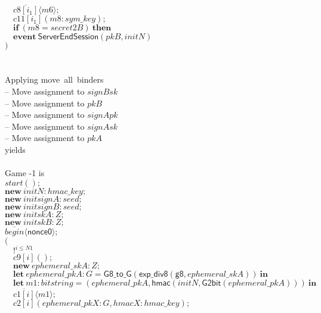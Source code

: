 \documentclass{article}
\newcommand{\cinput}[2]{{#1}({#2})}
\newcommand{\coutput}[2]{\overline{#1}\langle{#2}\rangle}
\newcommand{\kw}[1]{\mathbf{#1}}
\newcommand{\kwf}[1]{\mathsf{#1}}
\newcommand{\var}[1]{\mathit{#1}}
\newcommand{\kwt}[1]{\mathit{#1}}
\newcommand{\kwp}[1]{\mathit{#1}}
\newcommand{\kwc}[1]{\mathit{#1}}
\begin{document}
\begin{tabbing}
\>$\quad \coutput{\kwc{c8}[\var{i}_{1}]}{\var{m6}};$\\
\>$\quad \cinput{\kwc{c11}[\var{i}_{1}]}{\var{m8}: \kwt{sym{\_}key}};$\\
\>$\quad \kw{if}\ (\var{m8}  =  \var{secret2B})\ \kw{then}$\\
\>$\quad \kw{event}\ \kwf{ServerEndSession}(\var{pkB}, \var{initN})$\\
\>$)$\\
\\
\\
Applying move\ all\ binders\\
\quad -- Move assignment to $\var{signBsk}$\\
\quad -- Move assignment to $\var{pkB}$\\
\quad -- Move assignment to $\var{signApk}$\\
\quad -- Move assignment to $\var{signAsk}$\\
\quad -- Move assignment to $\var{pkA}$\\
yields\\
\\
Game -1 is\\
\>$\cinput{\kwc{start}}{};$\\
\>$\kw{new}\ \var{initN}: \kwt{hmac{\_}key};$\\
\>$\kw{new}\ \var{initsignA}: \kwt{seed};$\\
\>$\kw{new}\ \var{initsignB}: \kwt{seed};$\\
\>$\kw{new}\ \var{initskA}: \kwt{Z};$\\
\>$\kw{new}\ \var{initskB}: \kwt{Z};$\\
\>$\coutput{\kwc{begin}}{\kwf{nonce0}};$\\
\>$($\\
\>$\quad !^{\var{i} \leq \kwp{N1}}$\\
\>$\quad \cinput{\kwc{c9}[\var{i}]}{};$\\
\>$\quad \kw{new}\ \var{ephemeral{\_}skA}: \kwt{Z};$\\
\>$\quad \kw{let}\ \var{ephemeral{\_}pkA}: \kwt{G} = \kwf{G8{\_}to{\_}G}(\kwf{exp{\_}div8}(\kwf{g8}, \var{ephemeral{\_}skA}))\ \kw{in}$\\
\>$\quad \kw{let}\ \var{m1}: \kwt{bitstring} = \kwf{}(\var{ephemeral{\_}pkA}, \kwf{hmac}(\var{initN}, \kwf{G2bit}(\var{ephemeral{\_}pkA})))\ \kw{in}$\\
\>$\quad \coutput{\kwc{c1}[\var{i}]}{\var{m1}};$\\
\>$\quad \cinput{\kwc{c2}[\var{i}]}{\var{ephemeral{\_}pkX}: \kwt{G}, \var{hmacX}: \kwt{hmac{\_}key}};$\\

\end{tabbing}
\end{document}
